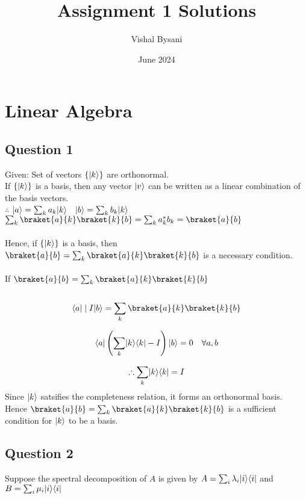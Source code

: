 \documentclass{article}
\title{Assignment 1 Solutions}
\author{Vishal Bysani}
\date{June 2024}
\DeclarePairedDelimiter\bra{\langle}{\rvert}
\DeclarePairedDelimiter\ket{\lvert}{\rangle}
\begin{document}
\maketitle
\section{Linear Algebra}
\subsection{Question 1}
Given:  Set of vectors $\{\ket{k}\} $ are orthonormal.\\

\noindent
If $\{\ket{k}\} $ is a basis, then any vector $\ket{v}$ can be written as a linear combination of the basis vectors.\\

$\therefore$ $\ket{a} = \sum_{k} a_k \ket{k}  \quad \ket{b} = \sum_{k} b_k \ket{k}$\\

\noindent
$\sum_{k} \braket{a}{k} \braket{k}{b} = \sum_{k} a_k^* b_k = \braket{a}{b}$\\\\
\noindent
Hence, if $\{\ket{k}\} $ is a basis, then $\braket{a}{b} = \sum_{k} \braket{a}{k} \braket{k}{b}$ is a necessary condition.\\\\

\noindent
If $\braket{a}{b} = \sum_{k} \braket{a}{k} \braket{k}{b}$\\\\
\[ \bra{a}\mid I \ket{b} =  \sum_{k} \braket{a}{k} \braket{k}{b}\]

\[ \bra{a} \left(\sum_k \ket{k}\bra{k}  - I\right)\ket{b} = 0  \quad \forall a,b\]

\[ \therefore \sum_k \ket{k}\bra{k}  = I\]
\noindent
Since {$\ket{k}$} satsifies the completeness relation, it forms an orthonormal basis.\\
Hence $\braket{a}{b} = \sum_{k} \braket{a}{k} \braket{k}{b}$ is a sufficient condition for {$\ket{k}$} to be a basis. \\


\subsection{Question 2}
Suppose the spectral decomposition of $A$ is given by $A = \sum_{i} \lambda_i \ket{i}\bra{i}$ and $B = \sum_{i} \mu_i \ket{i}\bra{i}$\\
\end{document}
